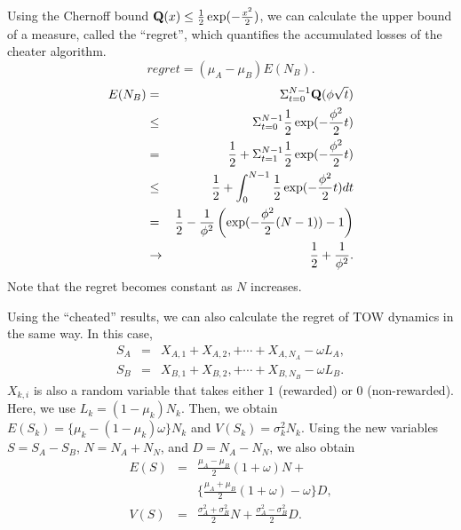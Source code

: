 \documentclass[twocolumn,showpacs,preprintnumbers,amsmath,amssymb]{revtex4}
\begin{document}
Using the Chernoff bound ${\bf Q}(x)  \leq  \frac{1}{2} \exp(-\frac{x^2}{2})$, 
we can calculate the upper bound of a measure, called the ``regret'', which quantifies the accumulated losses of the cheater algorithm.
\begin{equation}
regret = (\mu_A - \mu_B) E(N_B).
\end{equation}
\begin{eqnarray}
E(N_B) & = & \Sigma_{t=0}^{N-1} {\bf Q}(\phi \sqrt{t}) \nonumber \\
       & \leq & \Sigma_{t=0}^{N-1} \frac{1}{2} \exp(-\frac{\phi^2}{2} t) \nonumber \\
       & = & \frac{1}{2} + \Sigma_{t=1}^{N-1} \frac{1}{2} \exp(-\frac{\phi^2}{2} t) \nonumber \\
       & \leq & \frac{1}{2} + \int_{0}^{N-1} \frac{1}{2} \exp(-\frac{\phi^2}{2} t) dt \nonumber \\
       & = & \frac{1}{2} - \frac{1}{\phi^2} \left( \exp(-\frac{\phi^2}{2}(N-1))  - 1  \right) \\
       & \rightarrow & \frac{1}{2} + \frac{1}{\phi^2} .
\end{eqnarray} 
Note that the regret becomes constant as $N$ increases.


Using the ``cheated'' results, we can also calculate the regret of TOW dynamics in the same way.
In this case, 
\begin{eqnarray}
S_A  & = & X_{A, 1} + X_{A, 2}, + \cdots + X_{A, N_A} - \omega L_A , \\
S_B  & = & X_{B, 1} + X_{B, 2}, + \cdots + X_{B, N_B} - \omega L_B .
\end{eqnarray} 
$X_{k, i}$ is also a random variable that takes either $1$ (rewarded) or $0$ (non-rewarded).
Here, we use $L_k$$=$$(1 - \mu_k) N_k$.
Then, we obtain $E (S_k)  =  \{ \mu_k - (1 - \mu_k) \omega \}  N_k$ and $V (S_k)  = \sigma_k^{2} N_k$. 
Using the new variables $S = S_A - S_B$, $N = N_A + N_N$, and $D = N_A - N_N$, we also obtain 
\begin{eqnarray}
E (S)  & = & \frac{\mu_A - \mu_B}{2} (1 + \omega) N + \nonumber \\
       &   & \{ \frac{\mu_A + \mu_B}{2} (1 + \omega) - \omega \} D   ,\\
V (S)  & = & \frac{\sigma_A^2 + \sigma_B^2}{2} N +  \frac{\sigma_A^2 - \sigma_B^2}{2} D .
\end{eqnarray} 
\end{document}
